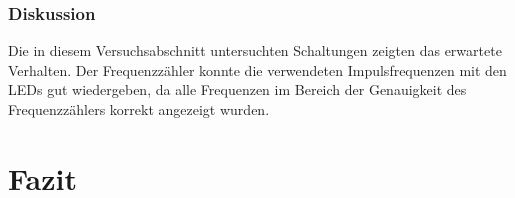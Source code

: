 \documentclass[12pt,a4paper]{article}
\begin{document}
\subsubsection*{Diskussion}
Die in diesem Versuchsabschnitt untersuchten Schaltungen zeigten das erwartete Verhalten. Der Frequenzzähler konnte die verwendeten Impulsfrequenzen mit den LEDs gut wiedergeben, da alle Frequenzen im Bereich der Genauigkeit des Frequenzzählers korrekt angezeigt wurden.

\section{Fazit}
\end{document}
